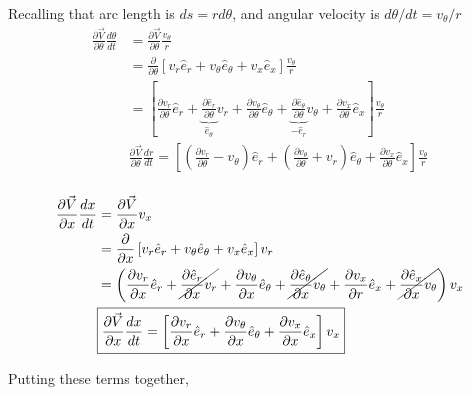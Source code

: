 Recalling that arc length is $ds = rd\theta$, and angular velocity is $d\theta/dt = v_{\theta}/r$
\begin{align*}
\frac{\partial \vec{V}}{ \partial \theta}\frac{d\theta}{dt} 
&= \frac{\partial \vec{V}}{ \partial \theta}\frac{v_{\theta}}{r}\\
&= \frac{\partial}{\partial \theta}
\left[
v_r 	   \hat{e}_r +
v_{\theta} \hat{e}_{\theta} +
v_x		   \hat{e}_x
\right]  \frac{v_{\theta}}{r} \\
& =
\left[
\frac{\partial v_r}{\partial \theta} 		\hat{e}_r +
\underbrace{\frac{\partial  \hat{e}_r}{\partial \theta}}_{\hat{e}_{\theta}} 		v_r       +
\frac{\partial v_{\theta}}{\partial \theta}		\hat{e}_{\theta} +
\underbrace{\frac{\partial \hat{e}_{\theta}}{\partial \theta}}_{-\hat{e}_{r}}  v_{\theta}  +
\frac{\partial v_x}{\partial \theta}\hat{e}_{x} 
\right] \frac{v_{\theta}}{r} \\ 
&\boxed{ 
	\frac{\partial \vec{V}}{ \partial  \theta}\frac{dr}{dt}     = 
	\left[\left(\frac{\partial 		  v_r}{\partial \theta} - v_{\theta} \right)		\hat{e}_r +
	\left(\frac{\partial   v_{\theta}}{\partial \theta}	+ v_r	     \right)\hat{e}_{\theta} +
	\frac{\partial v_x}{\partial \theta}\hat{e}_{x}
	\right] \frac{v_{\theta}}{r}} \\
\end{align*}

\begin{align*}
\frac{\partial \vec{V}}{ \partial x}\frac{dx}{dt}  &= \frac{\partial \vec{V}}{ \partial x}v_x\\
&= \frac{\partial}{\partial x}
\left[
v_r 	   \hat{e}_r +
v_{\theta} \hat{e}_{\theta} +
v_x		   \hat{e}_x
\right]  v_r \\ 
&=
\left(
\frac{\partial v_r}{\partial x} 		\hat{e}_r +
\cancel{\frac{\partial  \hat{e}_r}{\partial x} 		v_r}       +
\frac{\partial v_{\theta}}{\partial x}		\hat{e}_{\theta} +
\cancel{\frac{\partial \hat{e}_{\theta}}{\partial x} v_{\theta}}  +
\frac{\partial v_x}{\partial r}\hat{e}_{x} +
\cancel{\frac{\partial \hat{e}_{x}}{\partial x} v_{\theta}} \right) v_x\\ 
&\boxed{ 
	\frac{\partial \vec{V}}{ \partial x}\frac{dx}{dt}     = \left[
	\frac{\partial 		  v_r}{\partial x} 		\hat{e}_r +
	\frac{\partial v_{\theta}}{\partial x}		\hat{e}_{\theta} +
	\frac{\partial v_x}{\partial x}\hat{e}_{x}\right] v_x} \\
\end{align*}


Putting these terms together,

